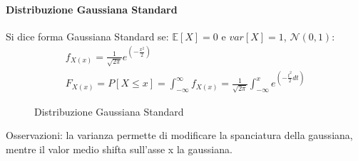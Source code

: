             \paragraph{Distribuzione Gaussiana Standard}
                Si dice forma Gaussiana Standard se: $\mathbb{E}[X] = 0$ e $var[X] = 1$, $\mathcal{N}(0,1)$:
                \begin{gather}
                    f_{X(x)} = \frac{1}{\sqrt{2\pi}} e^{\displaystyle\left(-\frac{x^2}{2}\right)}\nonumber \\
                    F_{X(x)} =P[X\leq x] = \int_{-\infty}^{\infty}f_{X(x)} =\frac{1}{\sqrt{2\pi}} \int_{-\infty}^{x}e^{\displaystyle\left(-\frac{t^2}{2}dt\right)}\nonumber 
                \end{gather}

                \begin{figure}[H]
                    \centering
                    \hfill
                    \caption{Distribuzione Gaussiana Standard}
                \end{figure}
                Osservazioni: la varianza permette di modificare la spanciatura della gaussiana, mentre il valor medio shifta sull'asse x la gaussiana.

